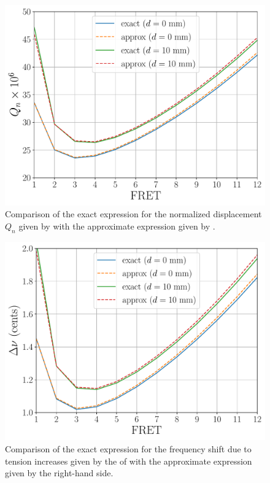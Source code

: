 

\begin{figure}
  \centering
  \includegraphics[width=5.0in]{../figures/qn_test}
  \caption{\label{fig:qn_test} Comparison of the exact expression for the normalized displacement $Q_n$ given by  with the approximate expression given by .}
\end{figure}

\begin{figure}
  \centering
  \includegraphics[width=5.0in]{../figures/tn_test}
  \caption{\label{fig:tn_test} Comparison of the exact expression for the frequency shift due to tension increases given by the \lhs of  with the approximate expression given by the right-hand side.}
\end{figure}

